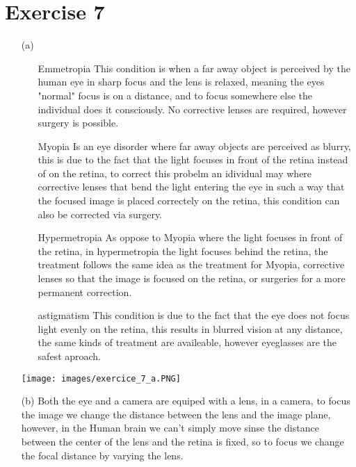 \documentclass[a4paper]{article}
\begin{document}
\section*{Exercise 7}
\begin{itemize}
\item[(a)]
\begin{itemize}
\item[Emmetropia] This condition is when a far away object is perceived by the human eye in sharp focus and the lens is relaxed, meaning the eyes "normal" focus is on a distance, and to focus somewhere else the individual does it consciously. No corrective lenses are required, however surgery is possible.
\item[Myopia] Is an eye disorder where far away objects are perceived as blurry, this is due to the fact that the light focuses in front of the retina instead of on the retina, to correct this probelm an idividual may where corrective lenses that bend the light entering the eye in such a way that the focused image is placed correctely on the retina, this condition can also be corrected via surgery.
\item[Hypermetropia] As oppose to Myopia where the light focuses in front of the retina, in hypermetropia the light focuses behind the retina, the treatment follows the same idea as the treatment for Myopia, corrective lenses so that the image is focused on the retina, or surgeries for a more permanent correction.
\item[astigmatism] This condition is due to the fact that the eye does not focus light evenly on the retina, this results in blurred vision at any distance, the same kinds of treatment are availeable, however eyeglasses are the safest aproach.
\end{itemize}
\begin{center}
\texttt{[image: images/exercice\_7\_a.PNG]}\\[1cm] 
\end{center}
\item[(b)] Both the eye and a camera are equiped with a lens, in a camera, to focus the image we change the distance between the lens and the image plane, however, in the Human brain we can't simply move sinse the distance between the center of the lens and the retina is fixed, so to focus we change the focal distance by varying the lens.
\end{itemize}

\end{document}

